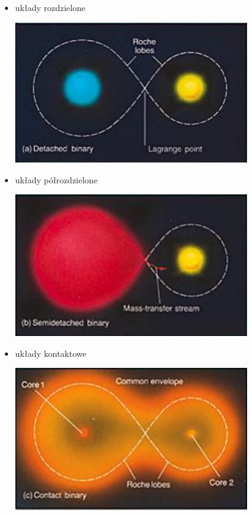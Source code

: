 \documentclass[../index.tex]{subfiles}
\begin{document}
            \begin{itemize}
                \item układy rozdzielone
                \begin{center}
                    \includegraphics[width=10cm]{images/ukladPodwojnyRozdzielone.png}
                \end{center}
                \item układy półrozdzielone
                \begin{center}
                    \includegraphics[width=10cm]{images/ukladPodwojnyPolrozdzielone.png}
                \end{center}
                \item układy kontaktowe
                \begin{center}
                    \includegraphics[width=10cm]{images/ukladPodwojnyKontaktowe.png}
                \end{center}
            \end{itemize}
\end{document}
